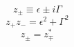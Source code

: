 \documentclass{article}
\begin{document}
\begin{equation} z_\pm \equiv \epsilon \pm i\Gamma \end{equation}
\begin{equation} z_+ z_- = \epsilon^2 + \Gamma^2 \end{equation}
\begin{equation} z_\pm = z_\mp^* \end{equation}
\end{document}
